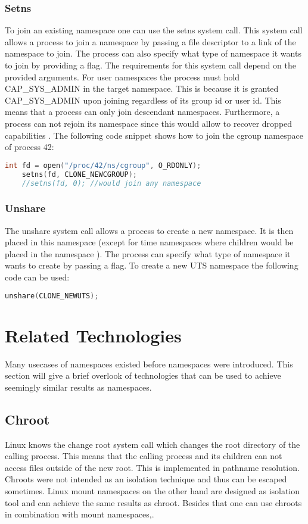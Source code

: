 \documentclass[10pt,twocolumn,a4paper]{article}
\begin{document}
\subsubsection{ Setns}
To join an existing namespace one can use the setns system call.
This system call allows a process to join a namespace by passing a file descriptor to a link of
the namespace to join. 
The process can also specify what type of namespace it wants to join by providing a flag. 
The requirements for this system call depend on the provided arguments. For user namespaces the process
must hold CAP\_SYS\_ADMIN in the target namespace. This is because  it is granted CAP\_SYS\_ADMIN upon joining
regardless of its group id or user id. This means that a process can only
join descendant namespaces. Furthermore, a process can not rejoin its namespace since this would allow to recover dropped capabilities \cite{23}. The following code snippet shows how to join the
cgroup namespace of process 42:
\begin{lstlisting}[language=C]
    int fd = open("/proc/42/ns/cgroup", O_RDONLY);
    setns(fd, CLONE_NEWCGROUP);
    //setns(fd, 0); //would join any namespace
\end{lstlisting}


\subsubsection{ Unshare}
The unshare system call allows a process to create a new namespace. It is then  placed in this
namespace (except for time namespaces where children would be placed in the namespace \cite{15}). 
The process can specify what type of namespace it wants to create by passing a flag. To create a new
UTS namespace the following code can be used:
\begin{lstlisting}[language=C]
    unshare(CLONE_NEWUTS);
\end{lstlisting}\cite{24}
\section{Related Technologies}\label{sec:related}
Many usecases of namespaces existed before namespaces were introduced. This section will give a
brief overlook of technologies that can be used to achieve seemingly similar results as namespaces.
\subsection{Chroot}
Linux knows the change root system call which changes the root directory of the calling
process. This means that the calling process and its children can not access files outside of the
new root. This is implemented in pathname resolution\cite{1}. Chroots were not intended as
an isolation technique and thus can be escaped sometimes. Linux mount namespaces on the other hand are designed as isolation tool and can achieve the same results as chroot. Besides that one can use
chroots in combination with mount namespaces\cite{1},\cite{25}. 
\end{document}

